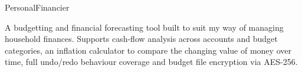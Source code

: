 \documentclass{portfolio}
\begin{document}
  \vfillForced

  
  \vfillForced
  
  \begin{ContactDetails}
  \end{ContactDetails}
  
  \vfillForced

  \tableofcontents 

  \vfillForced
  
  \begin{Projects}
    \begin{Project}{PersonalFinancier}
      \begin{ProjectOverview}
        A budgetting and financial forecasting tool built to suit my way of managing household finances.
        Supports cash-flow analysis across accounts and budget categories, an inflation calculator to compare
        the changing value of money over time, full undo/redo behaviour coverage and budget file encryption via AES-256. 


\end{ProjectOverview}
\end{Project}
\end{Projects}
\end{document}
